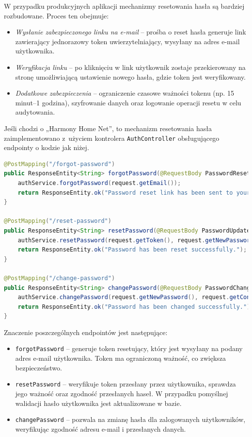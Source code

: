W przypadku produkcyjnych aplikacji mechanizmy resetowania hasła są bardziej rozbudowane. Proces ten obejmuje:
\begin{itemize}
    \item \emph{Wysłanie zabezpieczonego linku na e-mail} -- prośba o reset hasła generuje link zawierający jednorazowy token uwierzytelniający, wysyłany na adres e-mail użytkownika.
    \item \emph{Weryfikacja linku} -- po kliknięciu w link użytkownik zostaje przekierowany na stronę umożliwiającą ustawienie nowego hasła, gdzie token jest weryfikowany.
    \item \emph{Dodatkowe zabezpieczenia} -- ograniczenie czasowe ważności tokenu (np. 15 minut–1 godzina), szyfrowanie danych oraz logowanie operacji resetu w celu audytowania.
\end{itemize}

Jeśli chodzi o „Harmony Home Net”, to mechanizm resetowania hasła zaimplementowano z~użyciem kontrolera \texttt{AuthController} obsługującego endpointy o kodzie jak niżej.

\begin{lstlisting}[language=Java, style=JavaStyle, caption=Fragment klasy \texttt{AuthController}]
@PostMapping("/forgot-password")
public ResponseEntity<String> forgotPassword(@RequestBody PasswordResetRequest request) {
    authService.forgotPassword(request.getEmail());
    return ResponseEntity.ok("Password reset link has been sent to your email.");
}

@PostMapping("/reset-password")
public ResponseEntity<String> resetPassword(@RequestBody PasswordUpdateRequest request) {
    authService.resetPassword(request.getToken(), request.getNewPassword(), request.getConfirmPassword());
    return ResponseEntity.ok("Password has been reset successfully.");
}

@PostMapping("/change-password")
public ResponseEntity<String> changePassword(@RequestBody PasswordChangeRequest request) {
    authService.changePassword(request.getNewPassword(), request.getConfirmPassword(), request.getEmail());
    return ResponseEntity.ok("Password has been changed successfully.");
}
\end{lstlisting}

\noindent Znaczenie poszczególnych endpointów jest następujące:
\begin{itemize}
\item \texttt{forgotPassword} -- generuje token resetujący, który jest wysyłany na podany adres e-mail użytkownika. Token ma ograniczoną ważność, co zwiększa bezpieczeństwo.
\item \texttt{resetPassword} -- weryfikuje token przesłany przez użytkownika, sprawdza jego ważność oraz zgodność przesłanych haseł. W przypadku pomyślnej walidacji hasło użytkownika jest aktualizowane w bazie.
\item \texttt{changePassword} -- pozwala na zmianę hasła dla zalogowanych użytkowników, weryfikując zgodność adresu e-mail i przesłanych danych.
\end{itemize}

